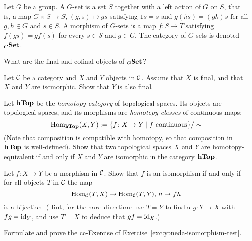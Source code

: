 \begin{exercise} Let $G$ be a group. A $G$-set is a set $S$ together with a left action of $G$ on $S$, that is, a map $G\times S \to S,\, (g,s)\mapsto gs$ satisfying $1s=s$ and $g(hs)=(gh)s$ for all $g,h \in G$ and $s\in S$. A morphism of $G$-sets is a map $f\colon S\to T$ satisfying $f(gs)=gf(s)$ for every $s\in S$ and $g\in G$. The category of $G$-sets is denoted $_{G}\mathbf{Set}$. 

What are the final and cofinal objects of $_{G}\mathbf{Set}$? 
\end{exercise}

\begin{exercise}
Let ${\mathcal{C}}$ be a category and $X$ and $Y$ objects in ${\mathcal{C}}$. Assume that $X$ is final, and that $X$ and $Y$ are isomorphic. Show that $Y$ is also final.
\end{exercise}


\begin{exercise}
Let $\mathbf{hTop}$ be the \emph{homotopy category} of topological spaces. Its objects are 
topological spaces, and its morphisms are \emph{homotopy classes} of continuous maps:
\[
	\operatorname{Hom}_{\mathbf{hTop}}(X,Y) := \{ f\colon X\to Y \mid \text{$f$ continuous}\}/\sim
\]
(Note that composition is compatible with homotopy, so that composition in $\mathbf{hTop}$ is well-defined). Show that two topological spaces $X$ and $Y$ are homotopy-equivalent if and only if $X$ and $Y$ are isomorphic in the category $\mathbf{hTop}$. 
\end{exercise}

\begin{exercise}\label{exc:yoneda-isomorphism-test}
Let $f\colon X\to Y$ be a morphism in ${\mathcal{C}}$. Show that $f$ is an isomorphism if and only if for all objects $T$ in ${\mathcal{C}}$ the map
\[
	\operatorname{Hom}_{\mathcal{C}}(T,X) \to \operatorname{Hom}_{\mathcal{C}}(T,Y),\, h \mapsto fh
\]
is a bijection. (Hint, for the hard direction: use $T=Y$ to find a $g\colon Y\to X$ with $fg={\rm id}_Y$, and use $T=X$ to deduce that $gf={\rm id}_X$.)
\end{exercise}

\begin{exercise}Formulate and prove the co-Exercise of Exercise~\ref{exc:yoneda-isomorphism-test}.
\end{exercise}



